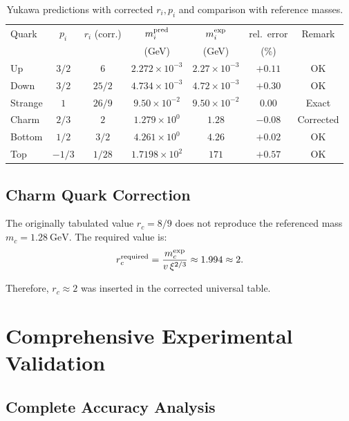 	\begin{table}[h!]
		\centering
		\begin{tabular}{lcccccc}
			\toprule
			Quark & $p_i$ & $r_i$ (corr.) & $m_i^{\rm pred}$ & $m_i^{\rm exp}$ & rel.\ error & Remark\\
			& & & (GeV) & (GeV) & (\%) & \\
			\midrule
			Up     & $3/2$ & $6$        & $2.272\times10^{-3}$ & $2.27\times10^{-3}$ & $+0.11$ & OK \\
			Down   & $3/2$ & $25/2$     & $4.734\times10^{-3}$ & $4.72\times10^{-3}$ & $+0.30$ & OK \\
			Strange& $1$   & $26/9$        & $9.50\times10^{-2}$  & $9.50\times10^{-2}$  & $0.00$ & Exact\\
			Charm  & $2/3$ & $2$      & $1.279\times10^{0}$  & $1.28$              & $-0.08$ & Corrected\\
			Bottom & $1/2$ & $3/2$      & $4.261\times10^{0}$   & $4.26$              & $+0.02$ & OK \\
			Top    & $-1/3$& $1/28$     & $1.7198\times10^{2}$  & $171$               & $+0.57$ & OK \\
			\bottomrule
		\end{tabular}
		\caption{Yukawa predictions with corrected $r_i,p_i$ and comparison with reference masses.}
	\end{table}
	
	\subsection{Charm Quark Correction}
	\label{subsec:charm_correction}
	
	The originally tabulated value $r_c=8/9$ does not reproduce the referenced mass $m_c=1.28\ \mathrm{GeV}$. The required value is:
	\[
	r_c^{\rm required}=\frac{m_c^{\rm exp}}{v\,\xi^{2/3}}\approx 1.994 \approx 2.
	\]
	
	Therefore, $r_c \approx 2$ was inserted in the corrected universal table.
	
	\section{Comprehensive Experimental Validation}
	\label{sec:comprehensive_validation}
	
	\subsection{Complete Accuracy Analysis}
	\label{subsec:complete_accuracy}
	
